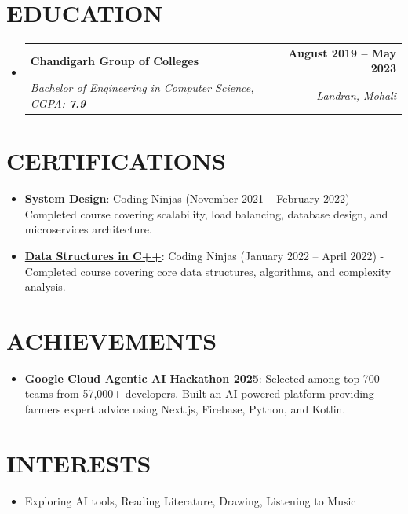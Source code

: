 \documentclass[letterpaper,11pt]{article}
\makeatletter
\newcommand{\resumeItem}[1]{
  \item\small{
    {#1 \vspace{-2pt}}
  }
}
\newcommand{\resumeSubheading}[4]{
  \vspace{-2pt}\item
    \begin{tabular*}{1.0\textwidth}[t]{l@{\extracolsep{\fill}}r}
      \textbf{\large#1} & \textbf{\small #2} \\
      \textit{\large#3} & \textit{\small #4} \\
      
    \end{tabular*}\vspace{-7pt}
}
\newcommand{\resumeSubHeadingListStart}{\begin{itemize}[leftmargin=0.0in, label={}]}
\newcommand{\resumeSubHeadingListEnd}{\end{itemize}}
\newcommand{\resumeItemListStart}{\begin{itemize}}
\newcommand{\resumeItemListEnd}{\end{itemize}\vspace{-5pt}}
\makeatother
\begin{document}
\section{EDUCATION}
  \resumeSubHeadingListStart
    \resumeSubheading
      {Chandigarh Group of Colleges}{August 2019 -- May 2023}
      {Bachelor of Engineering in Computer Science, CGPA: \textbf{7.9}}{Landran, Mohali}
  \resumeSubHeadingListEnd

\section{CERTIFICATIONS}
    \vspace{0pt}
    \resumeItemListStart
        \resumeItem{\normalsize{\href{http://ninjasfiles.s3.amazonaws.com/certificate18894980e4209379ac28665887f78da42bac5c2.pdf}{\textbf{System Design}}: Coding Ninjas (November 2021 -- February 2022) - Completed course covering scalability, load balancing, database design, and microservices architecture.}}
        \resumeItem{\normalsize{\href{https://ninjasfiles.s3.amazonaws.com/certificate19853580c201378561a01f48ae87f59e9220db2.pdf}{\textbf{Data Structures in C++}}: Coding Ninjas (January 2022 -- April 2022) - Completed course covering core data structures, algorithms, and complexity analysis.}}
    \resumeItemListEnd

\section{ACHIEVEMENTS}
    \vspace{0pt}
    \resumeItemListStart
        \resumeItem{\normalsize{\href{https://github.com/abhikumar002/Agentic-Gig-Project}{\textbf{Google Cloud Agentic AI Hackathon 2025}}: Selected among top 700 teams from 57,000+ developers. Built an AI-powered platform providing farmers expert advice using Next.js, Firebase, Python, and Kotlin.}}
    \resumeItemListEnd

\section{INTERESTS}
    \vspace{0pt}
    \resumeItemListStart
        \resumeItem{\normalsize{Exploring AI tools, Reading Literature, Drawing, Listening to Music}}
    \resumeItemListEnd
\end{document}
